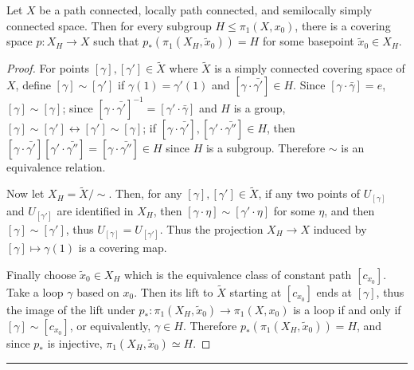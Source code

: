 \begin{prop} Let $X$ be a path connected, locally path connected, and semilocally simply connected space. Then for every subgroup $H\leq \pi_1(X,x_0)$, there is a covering space $p:X_H\rightarrow X$ such that $p_*(\pi_1(X_H,\tilde{x}_0))=H$ for some basepoint $\tilde{x}_0\in X_H$.
\end{prop}
\begin{proof}
For points $[\gamma],[\gamma']\in \tilde{X}$ where $\tilde{X}$ is a simply connected covering space of $X$, define $[\gamma]\sim [\gamma']$ if $\gamma(1)=\gamma'(1)$ and $[\gamma\cdot \bar{\gamma'}]\in H$. Since $[\gamma\cdot \bar{\gamma}]=e$, $[\gamma]\sim [\gamma]$; since $[\gamma\cdot \bar{\gamma'}]^{-1}=[\gamma'\cdot \bar{\gamma}]$ and $H$ is a group, $[\gamma]\sim [\gamma']\leftrightarrow[\gamma']\sim [\gamma]$; if $[\gamma\cdot \bar{\gamma'}],[\gamma'\cdot \bar{\gamma''}]\in H$, then $[\gamma\cdot \bar{\gamma'}][\gamma'\cdot \bar{\gamma''}]=[\gamma\cdot \bar{\gamma''}]\in H$ since $H$ is a subgroup. Therefore $\sim$ is an equivalence relation.

Now let $X_H=\tilde{X}/\sim$. Then, for any $[\gamma],[\gamma']\in \tilde{X}$, if any two points of $U_{[\gamma]}$ and $U_{[\gamma']}$ are identified in $X_H$, then $[\gamma\cdot \eta]\sim [\gamma'\cdot \eta]$ for some $\eta$, and then $[\gamma]\sim [\gamma']$, thus $U_{[\gamma]}=U_{[\gamma']}$. Thus the projection $X_H\rightarrow X$ induced by $[\gamma]\mapsto \gamma(1)$ is a covering map.

Finally choose $\tilde{x}_0\in X_H$ which is the equivalence class of constant path $[c_{x_0}]$. Take a loop $\gamma$ based on $x_0$. Then its lift to $\tilde{X}$ starting at $[c_{x_0}]$ ends at $[\gamma]$, thus the image of the lift under $p_*:\pi_1(X_H,\tilde{x}_0)\rightarrow \pi_1(X,x_0)$ is a loop if and only if $[\gamma]\sim [c_{x_0}]$, or equivalently, $\gamma\in H$. Therefore $p_*(\pi_1(X_H,\tilde{x}_0))=H$, and since $p_*$ is injective, $\pi_1(X_H,\tilde{x}_0)\simeq H$.
\end{proof}
\noindent\rule{\textwidth}{1pt}
\newline